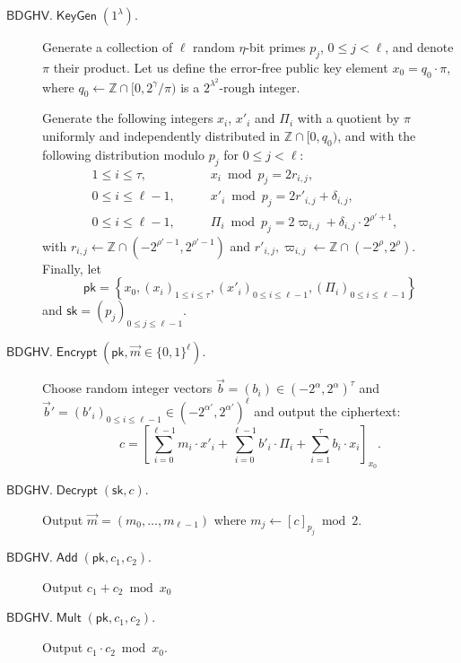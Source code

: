 \documentclass{llncs}
\renewcommand\leq\leqslant
\newcommand{\Z}{{\mathbb Z}}
\DeclareMathOperator{\KeyGen}{\ensuremath{\mathsf{KeyGen}}}
\DeclareMathOperator{\Encrypt}{\ensuremath{\mathsf{Encrypt}}}
\DeclareMathOperator{\Decrypt}{\ensuremath{\mathsf{Decrypt}}}
\DeclareMathOperator{\Add}{\ensuremath{\mathsf{Add}}}
\DeclareMathOperator{\Mult}{\ensuremath{\mathsf{Mult}}}
\newcommand*{\pk}{\ensuremath{\mathsf{pk}}}
\newcommand*{\sk}{\ensuremath{\mathsf{sk}}}
\newcommand*{\BDGHV}{\ensuremath{\mathsf{BDGHV}}}
\begin{document}
\begin{description}
\item[$\BDGHV.\KeyGen(1^\lambda)$.] Generate a collection of $\ell$
random $\eta$-bit primes $p_j$, $0\leq j<\ell$, and denote $\pi$
their product. Let us define the error-free public key element
$x_0=q_0\cdot\pi$, where $q_0 \leftarrow \Z \cap [0,2^{\gamma}/\pi)$
  is a $2^{\lambda^2}$-rough integer.

  Generate the following integers $x_i$, $x'_i$ and $\varPi_i$ with a quotient by $\pi$ uniformly
  and independently distributed in $\Z\cap [0, q_0)$, and with the
    following distribution modulo $p_j$ for $0 \leq j < \ell$:
$$
\begin{array}{lll}
1 \leq i \leq \tau, & \qquad x_i\bmod p_j = 2r_{i,j},& \\[.2cm]

0\leq i\leq \ell-1, & \qquad x'_i\bmod p_j = 2r'_{i,j}+\delta_{i,j},& \\[.2cm]

0\leq i\leq \ell-1, & \qquad \varPi_i \bmod p_j = 2\varpi_{i,j} +
\delta_{i,j}\cdot 2^{\rho'+1},
\end{array}
$$
with $r_{i,j}\leftarrow\Z\cap(-2^{\rho'-1}, 2^{\rho'-1})$ and $r'_{i,j}, \varpi_{i,j}\leftarrow\Z\cap(-2^{\rho}, 2^{\rho})$. Finally, let 
$$\pk = \left\{ x_0, \left(x_i\right)_{1\leq i\leq \tau}, \left(x'_i\right)_{0\leq i\leq \ell-1}, \left(\varPi_i\right)_{0\leq i\leq {\ell-1}}\right\}$$
and $\sk=(p_j)_{0\leq j\leq {\ell-1}}$.
\smallskip

\item[$\BDGHV.\Encrypt(\pk, \vec{m} \in \{0,1\}^\ell)$.] Choose 
  random integer vectors $\vec b=(b_i)%
  \in(-2^\alpha,2^{\alpha})^\tau$ and $\vec b'=(b'_i)_{0\leq i\leq
      \ell-1} \in(-2^{\alpha'},2^{\alpha'})^{\ell}$ 
and output the ciphertext:
\begin{equation}
\label{eq:encbdghv}
c = \left[\sum\limits_{i=0}^{\ell-1} m_i \cdot x'_i + 
	\sum_{i=0}^{\ell-1} b'_i\cdot \varPi_i  + \sum_{i=1}^\tau 
b_i\cdot x_i\right]_{x_0}.
\end{equation}
\item[$\BDGHV.\Decrypt(\sk, c)$.] Output $\vec{m}=(m_0,\ldots,m_{\ell-1})$ where $m_j \leftarrow [c]_{p_j} \bmod 2$.
\\\vspace{-0.25cm}
\item[$\BDGHV.\Add(\pk, c_1, c_2)$.] Output $c_1+c_2 \bmod x_0$
\\\vspace{-0.25cm}
\item[$\BDGHV.\Mult(\pk, c_1, c_2)$.] Output $c_1 \cdot c_2 \bmod x_0$.
\end{description}
\end{document}
